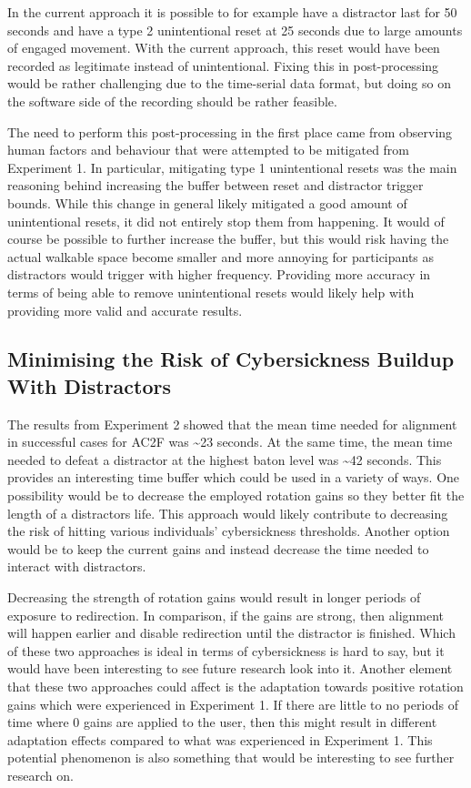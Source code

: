 In the current approach it is possible to for example have a distractor last for 50 seconds and have a type 2 unintentional reset at 25 seconds due to large amounts of engaged movement. With the current approach, this reset would have been recorded as legitimate instead of unintentional. Fixing this in post-processing would be rather challenging due to the time-serial data format, but doing so on the software side of the recording should be rather feasible. 

The need to perform this post-processing in the first place came from observing human factors and behaviour that were attempted to be mitigated from Experiment 1. In particular, mitigating type 1 unintentional resets was the main reasoning behind increasing the buffer between reset and distractor trigger bounds. While this change in general likely mitigated a good amount of unintentional resets, it did not entirely stop them from happening. It would of course be possible to further increase the buffer, but this would risk having the actual walkable space become smaller and more annoying for participants as distractors would trigger with higher frequency. Providing more accuracy in terms of being able to remove unintentional resets would likely help with providing more valid and accurate results. 

\subsection{Minimising the Risk of Cybersickness Buildup With Distractors}\label{sec:ex2MinimisingCybersickness}

The results from Experiment 2 showed that the mean time needed for alignment in successful cases for AC2F was \textasciitilde23 seconds. At the same time, the mean time needed to defeat a distractor at the highest baton level was \textasciitilde42 seconds. This provides an interesting time buffer which could be used in a variety of ways. One possibility would be to decrease the employed rotation gains so they better fit the length of a distractors life. This approach would likely contribute to decreasing the risk of hitting various individuals' cybersickness thresholds. Another option would be to keep the current gains and instead decrease the time needed to interact with distractors. 

Decreasing the strength of rotation gains would result in longer periods of exposure to redirection. In comparison, if the gains are strong, then alignment will happen earlier and disable redirection until the distractor is finished. Which of these two approaches is ideal in terms of cybersickness is hard to say, but it would have been interesting to see future research look into it. Another element that these two approaches could affect is the adaptation towards positive rotation gains which were experienced in Experiment 1. If there are little to no periods of time where 0 gains are applied to the user, then this might result in different adaptation effects compared to what was experienced in Experiment 1. This potential phenomenon is also something that would be interesting to see further research on.

